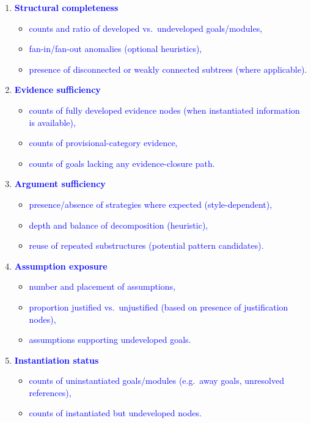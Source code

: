 \documentclass[11pt,twoside,a4paper]{article}
\begin{document}
\begin{enumerate}[leftmargin=2em]
  \item \textcolor{blue}{\textbf{Structural completeness}}
  \begin{itemize}[leftmargin=1.5em]
    \item \textcolor{blue}{counts and ratio of developed vs.\ undeveloped goals/modules,}
    \item \textcolor{blue}{fan-in/fan-out anomalies (optional heuristics),}
    \item \textcolor{blue}{presence of disconnected or weakly connected subtrees (where applicable).}
  \end{itemize}

  \item \textcolor{blue}{\textbf{Evidence sufficiency}}
  \begin{itemize}[leftmargin=1.5em]
    \item \textcolor{blue}{counts of fully developed evidence nodes (when instantiated information is available),}
    \item \textcolor{blue}{counts of provisional-category evidence,}
    \item \textcolor{blue}{counts of goals lacking any evidence-closure path.}
  \end{itemize}

  \item \textcolor{blue}{\textbf{Argument sufficiency}}
  \begin{itemize}[leftmargin=1.5em]
    \item \textcolor{blue}{presence/absence of strategies where expected (style-dependent),}
    \item \textcolor{blue}{depth and balance of decomposition (heuristic),}
    \item \textcolor{blue}{reuse of repeated substructures (potential pattern candidates).}
  \end{itemize}

  \item \textcolor{blue}{\textbf{Assumption exposure}}
  \begin{itemize}[leftmargin=1.5em]
    \item \textcolor{blue}{number and placement of assumptions,}
    \item \textcolor{blue}{proportion justified vs.\ unjustified (based on presence of justification nodes),}
    \item \textcolor{blue}{assumptions supporting undeveloped goals.}
  \end{itemize}

  \item \textcolor{blue}{\textbf{Instantiation status}}
  \begin{itemize}[leftmargin=1.5em]
    \item \textcolor{blue}{counts of uninstantiated goals/modules (e.g.\ away goals, unresolved references),}
    \item \textcolor{blue}{counts of instantiated but undeveloped nodes.}
  \end{itemize}
\end{enumerate}
\end{document}
